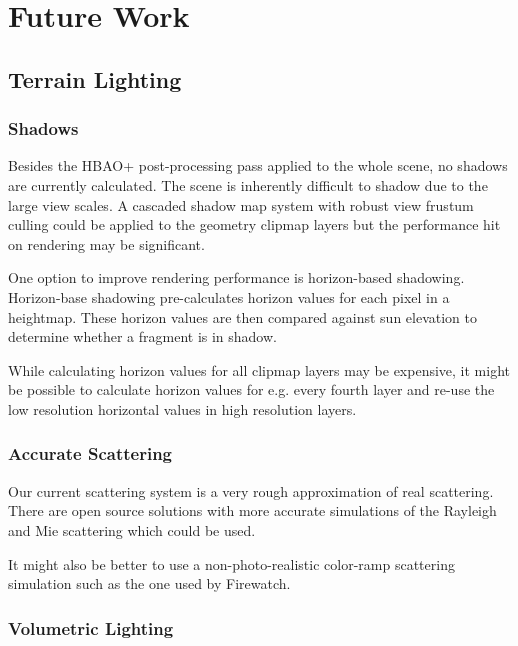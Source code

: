 
\iffalse  \fi

\chapter{Future Work} \label{futurework}

\section{Terrain Lighting}

\subsection{Shadows}

Besides the HBAO+ post-processing pass applied to the whole scene, no shadows are currently calculated.
The scene is inherently difficult to shadow due to the large view scales.
A cascaded shadow map system with robust view frustum culling could be applied to the geometry clipmap layers but the performance hit on rendering may be significant.

One option to improve rendering performance is horizon-based shadowing.
Horizon-base shadowing pre-calculates horizon values for each pixel in a heightmap.
These horizon values are then compared against sun elevation to determine whether a fragment is in shadow.

While calculating horizon values for all clipmap layers may be expensive, it might be possible to calculate horizon values for e.g. every fourth layer and re-use the low resolution horizontal values in high resolution layers.


\subsection{Accurate Scattering}

Our current scattering system is a very rough approximation of real scattering.
There are open source solutions with more accurate simulations of the Rayleigh and Mie scattering which could be used.

It might also be better to use a non-photo-realistic color-ramp scattering simulation such as the one used by Firewatch.


\subsection{Volumetric Lighting}

